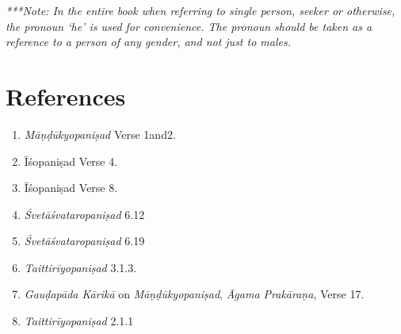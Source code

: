 \emph{***Note: In the entire book when referring to single person, seeker or otherwise, the pronoun `he' is used for convenience. The pronoun should be taken as a reference to a person of any gender, and not just to males.}

\section*{References}

\begin{enumerate}
\item
	\emph{Māṇḍūkyopaniṣad} Verse 1and2.
\item
  Īśopaniṣad Verse 4.
\item
  Īśopaniṣad Verse 8.
\item
  \emph{Śvetāśvataropaniṣad} 6.12
\item
  \emph{Śvetāśvataropaniṣad} 6.19
\item
  \emph{Taittirīyopaniṣad} 3.1.3.
\item
  \emph{Gauḍapāda Kārikā} on \emph{Māṇḍūkyopaniṣad}, \emph{Āgama Prakāraṇa}, Verse 17.
\item
  \emph{Taittirīyopaniṣad} 2.1.1
\end{enumerate}
